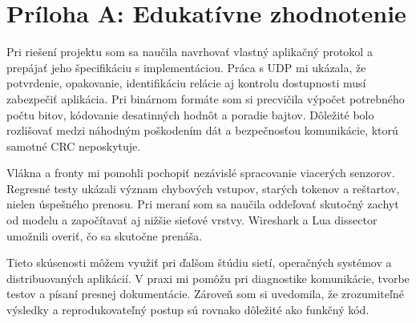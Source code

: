\documentclass[12pt,a4paper]{article}
\begin{document}
\clearpage
\appendix
\section{Príloha A: Edukatívne zhodnotenie}

Pri riešení projektu som sa naučila navrhovať vlastný aplikačný protokol a prepájať jeho špecifikáciu s implementáciou. Práca s UDP mi ukázala, že potvrdenie, opakovanie, identifikáciu relácie aj kontrolu dostupnosti musí zabezpečiť aplikácia. Pri binárnom formáte som si precvičila výpočet potrebného počtu bitov, kódovanie desatinných hodnôt a poradie bajtov. Dôležité bolo rozlišovať medzi náhodným poškodením dát a bezpečnosťou komunikácie, ktorú samotné CRC neposkytuje.

Vlákna a fronty mi pomohli pochopiť nezávislé spracovanie viacerých senzorov. Regresné testy ukázali význam chybových vstupov, starých tokenov a reštartov, nielen úspešného prenosu. Pri meraní som sa naučila oddeľovať skutočný zachyt od modelu a započítavať aj nižšie sieťové vrstvy. Wireshark a Lua dissector umožnili overiť, čo sa skutočne prenáša.

Tieto skúsenosti môžem využiť pri ďalšom štúdiu sietí, operačných systémov a distribuovaných aplikácií. V praxi mi pomôžu pri diagnostike komunikácie, tvorbe testov a písaní presnej dokumentácie. Zároveň som si uvedomila, že zrozumiteľné výsledky a reprodukovateľný postup sú rovnako dôležité ako funkčný kód.
\end{document}
